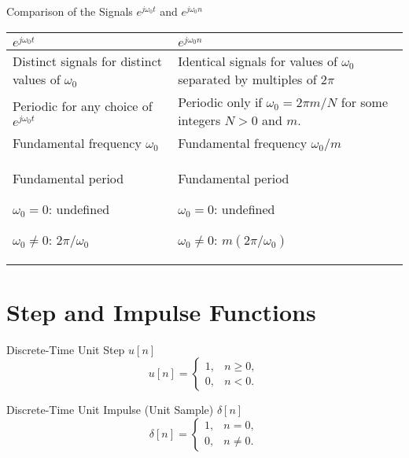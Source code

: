\begin{frame}{Comparison of the Signals $e^{j\omega_0 t}$ and $e^{j\omega_0 n}$}
    \begin{tabular}{@{}p{2.5in}p{2.7in}@{}}
        \toprule
        $e^{j\omega_0 t}$ & $e^{j\omega_0 n}$\\
        \midrule
        Distinct signals for distinct values of $\omega_0$ & Identical signals for values of $\omega_0$ separated by multiples of $2\pi$\\
        \midrule
        Periodic for any choice of $e^{j\omega_0 t}$ & Periodic only if $\omega_0 = 2\pi m/N$ for some integers $N>0$ and $m$.\\
        \midrule
        Fundamental frequency $\omega_0$ & Fundamental frequency $\omega_0/m$\\
        \midrule
        Fundamental period\par
        $\omega_0 = 0$: undefined\par
        $\omega_0 \neq 0$: $2\pi/\omega_0$
        &
        Fundamental period\par
        $\omega_0 = 0$: undefined\par
        $\omega_0 \neq 0$: $m(2\pi/\omega_0)$
        \\
        \bottomrule
    \end{tabular}
\end{frame}

\section{Step and Impulse Functions}
\begin{frame}[plain]{Discrete-Time Unit Step  $u[n]$}
    \begin{equation}
        u[n] = \begin{cases}
                 1, & n \geq 0,\\
                 0, & n<0.
               \end{cases}
    \end{equation}
    {
        {
            \centering
            
        }
    }
\end{frame}

\begin{frame}[plain]{Discrete-Time Unit Impulse (Unit Sample) $\delta[n]$}
    \begin{equation}
        \delta[n] = \begin{cases}
                 1, & n = 0,\\
                 0, & n \neq 0.
               \end{cases}
    \end{equation}
    {
        {
            \centering
            
        }
    }
\end{frame}



